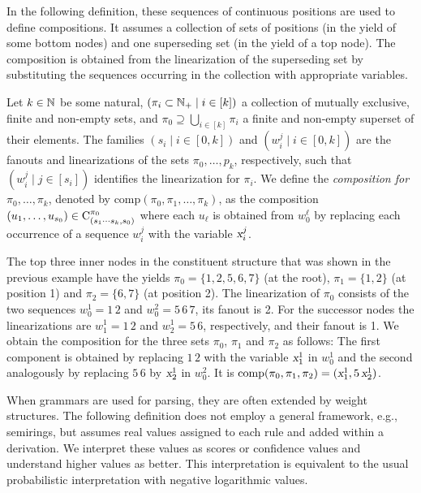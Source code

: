 \documentclass[../../document.tex]{subfiles}
\begin{document}
    In the following definition, these sequences of continuous positions are used to define  compositions.
    It assumes a collection of sets of positions (in the yield of some bottom nodes) and one superseding set (in the yield of a top node).
    The composition is obtained from the linearization of the superseding set by substituting the sequences occurring in the collection with appropriate variables.

    \begin{definition}
        Let \(k \in \mathbb{N}\) be some natural, \((\pi_i \subset \mathbb{N}_+ \mid i \in [k])\) a collection of mutually exclusive, finite and non-empty sets, and \(\pi_0 \supseteq \bigcup_{i \in [k]} \pi_i\) a finite and non-empty superset of their elements.
        The families \((s_i \mid i \in [0,k])\) and \((w_i^j \mid i \in [0,k])\) are the fanouts and linearizations of the sets \(\pi_0, \ldots, p_k\), respectively, such that \((w_i^j \mid j \in [s_i])\) identifies the linearization for \(\pi_i\).
        We define the \emph{composition for \(\pi_0, \ldots, \pi_k\)}, denoted by \(\mathrm{comp}(\pi_0, \pi_1, \ldots, \pi_k)\), as the composition \((u_1, \ldots, u_{s_0}) \in \mathrm{C}^{\pi_0}_{(s_1\cdots s_k, s_0)}\) where each \(u_\ell\) is obtained from \(w_0^\ell\) by replacing each occurrence of a sequence \(w_i^j\) with the variable \(\textsl{x}_i^j\).
    \end{definition}

    \begin{example}
        The top three inner nodes in the constituent structure that was shown in the previous example have the yields \(\pi_0 = \{1,2,5,6,7\}\) (at the root), \(\pi_1 = \{1,2\}\) (at position 1) and \(\pi_2 = \{6,7\}\) (at position 2).
        The linearization of \(\pi_0\) consists of the two sequences \(w_0^1 = 1\,2\) and \(w_0^2 = 5\,6\,7\), its fanout is 2.
        For the successor nodes the linearizations are \(w_1^1 = 1\,2\) and \(w_2^1 = 5\,6\), respectively, and their fanout is 1.
        We obtain the composition for the three sets \(\pi_0\), \(\pi_1\) and \(\pi_2\) as follows:
            The first component is obtained by replacing \(1\,2\) with the variable \(\textsl{x}_1^1\) in \(w_0^1\) and the second analogously by replacing \(5\,6\) by \(\textsl{x}_2^1\) in \(w_0^2\).
        It is \(\mathrm{comp}(\pi_0, \pi_1, \pi_2) = (\textsl{x}_1^1, 5\,\textsl{x}_2^1)\).
    \end{example}

    When grammars are used for parsing, they are often extended by weight structures.
    The following definition does not employ a general framework, e.g.\@, semirings, but assumes real values assigned to each rule and added within a derivation.
    We interpret these values as scores or confidence values and understand higher values as better.
    This interpretation is equivalent to the usual probabilistic interpretation \citep[Viterbi semiring]{Goodman} with negative logarithmic values.
\end{document}

